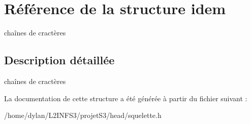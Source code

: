 \hypertarget{structidem}{}\section{Référence de la structure idem}
\label{structidem}


chaînes de cractères  




\subsection{Description détaillée}
chaînes de cractères 

La documentation de cette structure a été générée à partir du fichier suivant \+:\begin{DoxyCompactItemize}
\item 
/home/dylan/\+L2\+I\+N\+F\+S3/projet\+S3/head/squelette.\+h\end{DoxyCompactItemize}
